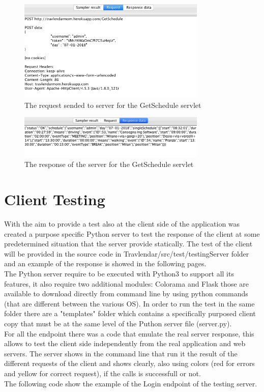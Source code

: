 \documentclass[numbers=noenddot, 12pt, a4paper, oneside]{scrbook}
\begin{document}
\begin{figure}[H]
	\centering
	\includegraphics[width=0.8\textwidth]{Test/GetScheduleReq}
	\caption{The request sended to server for the GetSchedule servlet}
\end{figure}

\begin{figure}[H]
	\centering
	\includegraphics[width=0.8\textwidth]{Test/GetScheduleResp}
	\caption{The response of the server for the GetSchedule servlet}
\end{figure}


\section*{Client Testing}
With the aim to provide a test also at the client side of the application was created a purpose specific Python server to test the response of the client at some predetermined situation that the server provide statically. 
The test of the client will be provided in the source code in Travlendar/src/test/testingServer folder and an example of the response is showed in the following pages. \\\newline
The Python server require to be executed with Python3 to support all its features, it also require two additional modules: Colorama and Flask those are available to download directly from command line by using python commands (that are different between the various OS).
In order to run the test in the same folder there are a "templates" folder which contains a specifically purposed client copy that must be at the same level of the Puthon server file (server.py).\\\newline
For all the endpoint there was a code that emulate the real server response, this allows to test the client side independently from the real application and web servers.
The server shows in the command line that run it the result of the different requests of the client and shows clearly, also using colors (red for errors and yellow for correct request), if the calls is successfull or not. \\\newline
The following code show the example of the Login endpoint of the testing server.
\end{document}
